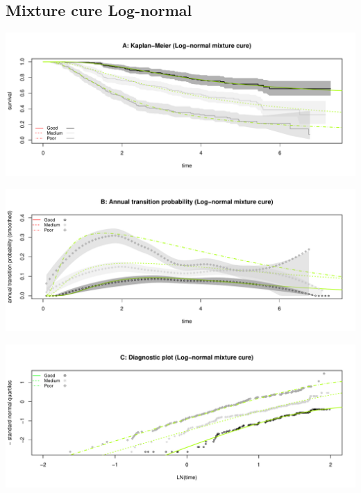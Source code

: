 \documentclass[]{article}
\begin{document}
\subsection{Mixture cure Log-normal}\label{mixture-cure-log-normal}

\begin{flushleft}\includegraphics[height=0.25\textheight]{Images/cure_lnorm_mix-1} \end{flushleft}

\begin{flushleft}\includegraphics[height=0.25\textheight]{Images/cure_lnorm_mix-2} \end{flushleft}

\begin{flushleft}\includegraphics[height=0.25\textheight]{Images/cure_lnorm_mix-3} \end{flushleft}

\newpage
\end{document}
